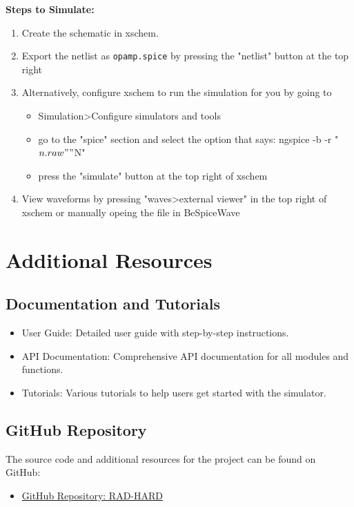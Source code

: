 \documentclass[12pt]{article}
\begin{document}
\textbf{Steps to Simulate:}
\begin{enumerate}
    \item Create the schematic in xschem.
    \item Export the netlist as \texttt{opamp.spice} by pressing the "netlist" button at the top right
    \item Alternatively, configure xschem to run the simulation for you by going to 
	\begin{itemize}
	\item Simulation\textgreater Configure simulators and tools
	\item go to the "spice" section and select the option that says: ngspice -b -r "$n.raw" "$N"
	\item press the "simulate" button at the top right of xschem
\end{itemize}	    
	\item View waveforms by pressing "waves\textgreater external viewer" in the top right of xschem or manually opeing the file in BeSpiceWave
\end{enumerate}

\section{Additional Resources}
\subsection{Documentation and Tutorials}
\begin{itemize}
    \item User Guide: Detailed user guide with step-by-step instructions.
    \item API Documentation: Comprehensive API documentation for all modules and functions.
    \item Tutorials: Various tutorials to help users get started with the simulator.
\end{itemize}

\subsection{GitHub Repository}
The source code and additional resources for the project can be found on GitHub:
\begin{itemize}
    \item \href{https://github.com/Jacoba1100254352/RAD-HARD}{GitHub Repository: RAD-HARD}
\end{itemize}
\end{document}
